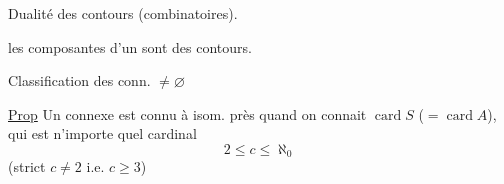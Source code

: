 Dualité des  contours (combinatoires).

 les composantes  d'un  sont  des contours.

Classification des  conn. $\ne\varnothing$

\uline{Prop} Un  connexe \inserted{$\ne\varnothing$} est connu à isom. près quand on connait $\operatorname{card}S$ ($=\operatorname{card}A$), qui est n'importe quel cardinal 
\[
2\le c\le\aleph_{0}
\]
(strict  $c\ne2$ i.e. $c\geqslant3$)

